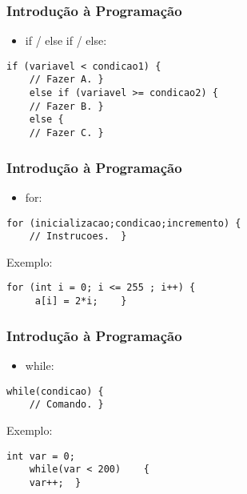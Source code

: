 \documentclass{beamer}
\begin{document}
\begin{frame}[fragile]
\frametitle{Introdução à Programação}
	\begin{itemize}
		\item if / else if / else:
	\end{itemize}

	\begin{lstlisting}[style=Arduino]
	if (variavel < condicao1) {
	// Fazer A.	}
	else if (variavel >= condicao2)	{
	// Fazer B.	}
	else {
	// Fazer C.	}	\end{lstlisting}
\end{frame}

\begin{frame}[fragile]
\frametitle{Introdução à Programação}
	\begin{itemize}
		\item for:
	\end{itemize}

	\begin{lstlisting}[style=Arduino]
	for (inicializacao;condicao;incremento)	{
	// Instrucoes.	}	\end{lstlisting}
	Exemplo:
	\begin{lstlisting}[style=Arduino]
	for (int i = 0; i <= 255 ; i++)	{
	 a[i] = 2*i;	}	\end{lstlisting}
\end{frame}

\begin{frame}[fragile]
	\frametitle{Introdução à Programação}
	\begin{itemize}
		\item while:
	\end{itemize}

	\begin{lstlisting}[style=Arduino]
	while(condicao)	{
	// Comando.	}	\end{lstlisting}
	Exemplo:
	\begin{lstlisting}[style=Arduino]
	int var = 0;
	while(var < 200)	{
	var++;	}	\end{lstlisting}
\end{frame}

\end{document}
